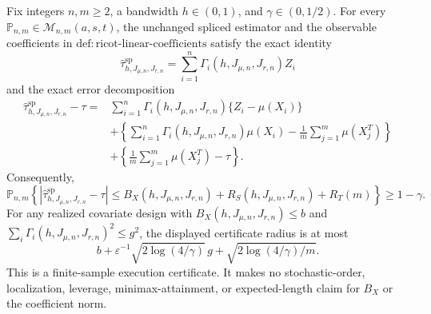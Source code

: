 Fix integers \(n,m\ge2\), a bandwidth \(h\in(0,1)\), and \(\gamma\in(0,1/2)\). For every \(\mathbb P_{n,m}\in\mathcal M_{n,m}(a,s,t)\), the unchanged spliced estimator and the observable coefficients in \(\mathrm{def:ricot\text{-}linear\text{-}coefficients}\) satisfy the exact identity
\[
\widehat\tau^{\mathrm{sp}}_{h,J_{\mu,n},J_{r,n}}=\sum_{i=1}^n\Gamma_i(h,J_{\mu,n},J_{r,n})Z_i
\]
and the exact error decomposition
\[
\begin{aligned}
\widehat\tau^{\mathrm{sp}}_{h,J_{\mu,n},J_{r,n}}-\tau
={}&\sum_{i=1}^n\Gamma_i(h,J_{\mu,n},J_{r,n})\{Z_i-\mu(X_i)\}\\
&+\left\{\sum_{i=1}^n\Gamma_i(h,J_{\mu,n},J_{r,n})\mu(X_i)-\frac1m\sum_{j=1}^m\mu(X_j^T)\right\}\\
&+\left\{\frac1m\sum_{j=1}^m\mu(X_j^T)-\tau\right\}.
\end{aligned}
\]
Consequently,
\[
\mathbb P_{n,m}\!\left\{\left|\widehat\tau^{\mathrm{sp}}_{h,J_{\mu,n},J_{r,n}}-\tau\right|
\le B_X(h,J_{\mu,n},J_{r,n})+R_S(h,J_{\mu,n},J_{r,n})+R_T(m)\right\}\ge1-\gamma.
\]
For any realized covariate design with \(B_X(h,J_{\mu,n},J_{r,n})\le b\) and \(\sum_i\Gamma_i(h,J_{\mu,n},J_{r,n})^2\le g^2\), the displayed certificate radius is at most
\[
b+\varepsilon^{-1}\sqrt{2\log(4/\gamma)}\,g+\sqrt{2\log(4/\gamma)/m}.
\]
This is a finite-sample execution certificate. It makes no stochastic-order, localization, leverage, minimax-attainment, or expected-length claim for \(B_X\) or the coefficient norm.